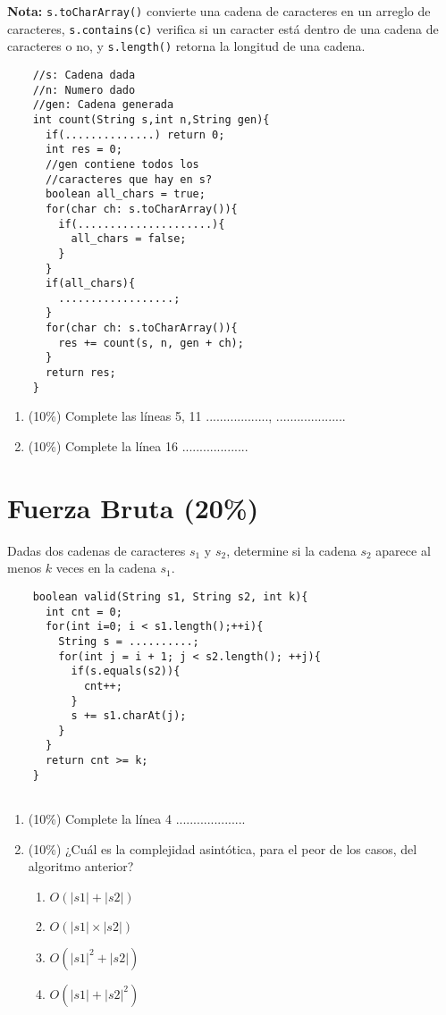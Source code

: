 \documentclass[10 pt]{article}
\begin{document}
\begin{multicols}{2}
{	\textbf{Nota:} \texttt{s.toCharArray()} convierte una cadena de caracteres en un arreglo de caracteres, \texttt{s.contains(c)} verifica si
	un caracter está dentro de una cadena de caracteres o no, y \texttt{s.length()} retorna la longitud de una cadena.
	}
	{\footnotesize
	\begin{lstlisting}
	//s: Cadena dada
	//n: Numero dado
	//gen: Cadena generada
	int count(String s,int n,String gen){
	  if(..............) return 0;
	  int res = 0;
	  //gen contiene todos los
	  //caracteres que hay en s? 
	  boolean all_chars = true;
	  for(char ch: s.toCharArray()){
	    if(.....................){
	      all_chars = false;
	    }
	  }
	  if(all_chars){
	    ..................;  
	  }
	  for(char ch: s.toCharArray()){
	    res += count(s, n, gen + ch);
	  }
	  return res;
	}
	\end{lstlisting}
	}
	\begin{enumerate}[label=\alph*]
		\item (10\%) Complete las líneas 5, 11 .................., ....................
		\item (10\%) Complete la línea 16 ...................
	\end{enumerate}




	\section{Fuerza Bruta (20\%)}
	Dadas dos cadenas de caracteres $s_1$ y $s_2$, determine si la cadena $s_2$ aparece al menos $k$ veces en la cadena $s_1$. 
	{\footnotesize
	\begin{lstlisting}
	boolean valid(String s1, String s2, int k){
	  int cnt = 0;
	  for(int i=0; i < s1.length();++i){
	    String s = ..........;
	    for(int j = i + 1; j < s2.length(); ++j){
	      if(s.equals(s2)){
	        cnt++;
	      }
	      s += s1.charAt(j);
	    }
	  }
	  return cnt >= k;
	}
	
	\end{lstlisting} 
	}
	\begin{enumerate}[label=\alph*]
		\item (10\%) Complete la línea 4 ....................
		\item (10\%) ¿Cuál es la complejidad asintótica, para el peor de los casos, del algoritmo anterior?
		\begin{enumerate}[label=\roman*]
			\item $O(|s1| + |s2|)$
			\item $O(|s1| \times |s2|)$
			\item $O(|s1|^2 + |s2|)$
			\item $O(|s1| + |s2|^2)$		
	\end{enumerate}
	\end{enumerate}
	



\end{multicols}
\end{document}
